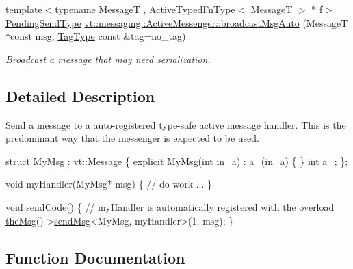 \begin{DoxyCompactItemize}
{\footnotesize template$<$typename MessageT , Active\+Typed\+Fn\+Type$<$ Message\+T $>$ $\ast$ f$>$ }\\\hyperlink{structvt_1_1messaging_1_1_active_messenger_a3626a6ca76d8ad4ec7c3b47a2c70d3a8}{Pending\+Send\+Type} \hyperlink{group__typesafehan_ga52ece14c329a6e27b3749fd93d60beaa}{vt\+::messaging\+::\+Active\+Messenger\+::broadcast\+Msg\+Auto} (MessageT $\ast$const msg, \hyperlink{namespacevt_a84ab281dae04a52a4b243d6bf62d0e52}{Tag\+Type} const \&tag=no\+\_\+tag)
\begin{DoxyCompactList}\small\item\em Broadcast a message that may need serialization. \end{DoxyCompactList}\end{DoxyCompactItemize}


\subsection{Detailed Description}
Send a message to a auto-\/registered type-\/safe active message handler. This is the predominant way that the messenger is expected to be used. 


\begin{DoxyCode}
\textcolor{keyword}{struct }MyMsg : \hyperlink{structvt_1_1messaging_1_1_active_msg}{vt::Message} \{
  \textcolor{keyword}{explicit} MyMsg(\textcolor{keywordtype}{int} in\_a) : a\_(in\_a) \{ \}
  \textcolor{keywordtype}{int} a\_;
\};

\textcolor{keywordtype}{void} myHandler(MyMsg* msg) \{
  \textcolor{comment}{// do work ...}
\}

\textcolor{keywordtype}{void} sendCode() \{
  \textcolor{comment}{// myHandler is automatically registered with the overload}
  \hyperlink{namespacevt_aeafd31f866aeb4dc6fc2f6ee97136350}{theMsg}()->\hyperlink{group__preregister_ga55c6ea91181ae20c681e73a356750916}{sendMsg}<MyMsg, myHandler>(1, msg);
\}
\end{DoxyCode}
 

\subsection{Function Documentation}
\mbox{\label{group__typesafehan_gadad0627a27bd7be174369cf14296afad}} 
